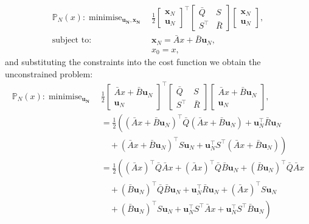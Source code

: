 \documentclass[a4paper,11pt,reqno]{amsart}
\newcommand{\tran}{\intercal}
\DeclareMathOperator*{\minimise}{minimise}
\begin{document}
\begin{subequations}
    \begin{align}
        \mathbb{P}_N(x): \minimise_{\bm{u_N},\bm{x_N}} \,
        & \tfrac{1}{2}
        \begin{bmatrix}
            \bm{x}_N\\
            \bm{u}_N
        \end{bmatrix}^{\tran}
        \begin{bmatrix}
            \bar{Q}&S\\
            S^{\tran}&\bar{R}
        \end{bmatrix}
        \begin{bmatrix}
            \bm{x}_N\\
            \bm{u}_N
        \end{bmatrix},
        \\
        \text{subject to: }\,
        & \bm{x}_{N} = \bar{A} x + \bar{B} \bm{u}_N,
        \\
        & x_{0} = x,
    \end{align}
\end{subequations}
and substituting the constraints into the cost function we obtain the unconstrained problem:
\begin{subequations}
    \begin{align}
        \mathbb{P}_N(x): \minimise_{\bm{u_N}} \,
        & \tfrac{1}{2}
        \begin{bmatrix}
            \bar{A} x + \bar{B}\bm{u}_N\\
            \bm{u}_N
        \end{bmatrix}^{\tran}
        \begin{bmatrix}
            \bar{Q}&S\\
            S^{\tran}&\bar{R}
        \end{bmatrix}
        \begin{bmatrix}
            \bar{A} x + \bar{B}\bm{u}_N\\
            \bm{u}_N
        \end{bmatrix},
        \\
        &=\tfrac{1}{2}\left((\bar{A}x + \bar{B}\bm{u}_N)^{\tran}\bar{Q}(\bar{A} x + \bar{B}\bm{u}_N)+\bm{u}_N^{\tran}\bar{R}\bm{u}_N\right.
        \\
        &\left.\quad+(\bar{A}x + \bar{B}\bm{u}_N)^{\tran}S\bm{u}_N+\bm{u}_N^{\tran}S^{\tran}(\bar{A} x + \bar{B}\bm{u}_N)\right) 
        \\
        &=\tfrac{1}{2}\left((\bar{A}x)^{\tran}\bar{Q}\bar{A}x+(\bar{A}x)^{\tran}\bar{Q}\bar{B}\bm{u}_N+(\bar{B}\bm{u}_N)^{\tran}\bar{Q}\bar{A}x\right.
        \\
        &\quad+(\bar{B}\bm{u}_N)^{\tran}\bar{Q}\bar{B}\bm{u}_N+\bm{u}_N^{\tran}\bar{R}\bm{u}_N+(\bar{A}x)^{\tran}S\bm{u}_N
        \\
        &\left.\quad+(\bar{B}\bm{u}_N)^{\tran}S\bm{u}_N+\bm{u}_N^{\tran}S^{\tran}\bar{A}x+\bm{u}_N^{\tran}S^{\tran}\bar{B}\bm{u}_N\right) 
    \end{align}
\end{subequations}
\end{document}
